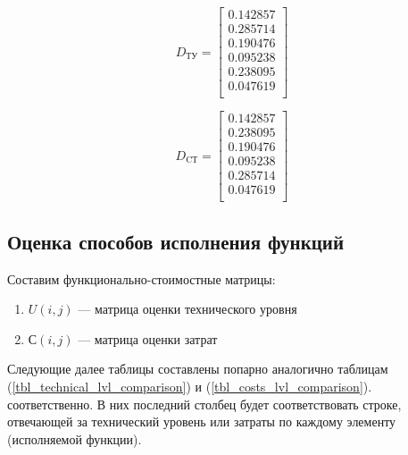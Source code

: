 \begin{equation}
    D_\text{ТУ} =
    \begin{bmatrix}
        0.142857 \\
        0.285714 \\
        0.190476 \\
        0.095238 \\
        0.238095 \\
        0.047619 \\
    \end{bmatrix}
    \label{eq_tu_matrix}
\end{equation}

\begin{equation}
    D_\text{CТ} =
    \begin{bmatrix}
        0.142857 \\
        0.238095 \\
        0.190476 \\
        0.095238 \\
        0.285714 \\
        0.047619 \\
    \end{bmatrix}
    \label{eq_st_matrix}
\end{equation}

\subsection{Оценка способов исполнения функций}
Составим функционально-стоимостные матрицы:
\begin{enumerate}
    \item $U(i,j)$ --- матрица оценки технического уровня
    \item $С(i,j)$ --- матрица оценки затрат
\end{enumerate}

Следующие далее таблицы составлены попарно аналогично таблицам
(\ref{tbl_technical_lvl_comparison}) и (\ref{tbl_costs_lvl_comparison}).
соответственно. В них последний столбец будет соответствовать строке, отвечающей
за технический уровень или затраты по каждому элементу (исполняемой функции).


